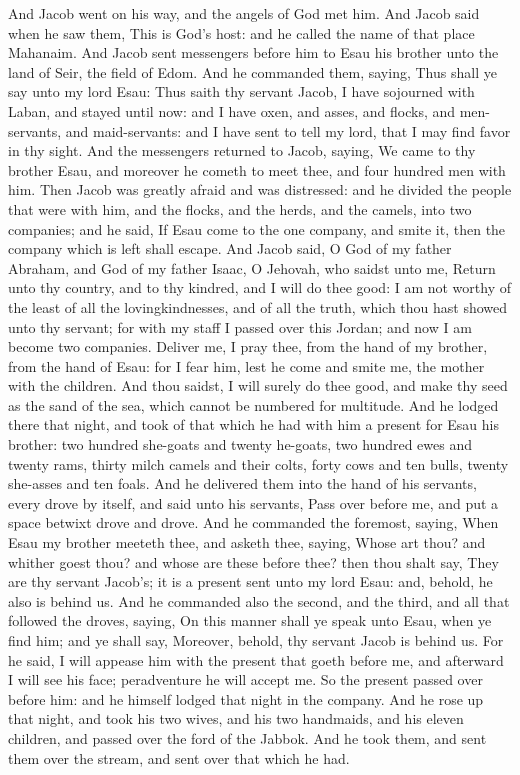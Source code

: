And Jacob went on his way, and the angels of God met him. And Jacob said when he saw them, This is God’s host: and he called the name of that place Mahanaim.  And Jacob sent messengers before him to Esau his brother unto the land of Seir, the field of Edom. And he commanded them, saying, Thus shall ye say unto my lord Esau: Thus saith thy servant Jacob, I have sojourned with Laban, and stayed until now: and I have oxen, and asses, and flocks, and men-servants, and maid-servants: and I have sent to tell my lord, that I may find favor in thy sight. And the messengers returned to Jacob, saying, We came to thy brother Esau, and moreover he cometh to meet thee, and four hundred men with him. Then Jacob was greatly afraid and was distressed: and he divided the people that were with him, and the flocks, and the herds, and the camels, into two companies; and he said, If Esau come to the one company, and smite it, then the company which is left shall escape. And Jacob said, O God of my father Abraham, and God of my father Isaac, O Jehovah, who saidst unto me, Return unto thy country, and to thy kindred, and I will do thee good: I am not worthy of the least of all the lovingkindnesses, and of all the truth, which thou hast showed unto thy servant; for with my staff I passed over this Jordan; and now I am become two companies. Deliver me, I pray thee, from the hand of my brother, from the hand of Esau: for I fear him, lest he come and smite me, the mother with the children. And thou saidst, I will surely do thee good, and make thy seed as the sand of the sea, which cannot be numbered for multitude.  And he lodged there that night, and took of that which he had with him a present for Esau his brother: two hundred she-goats and twenty he-goats, two hundred ewes and twenty rams, thirty milch camels and their colts, forty cows and ten bulls, twenty she-asses and ten foals. And he delivered them into the hand of his servants, every drove by itself, and said unto his servants, Pass over before me, and put a space betwixt drove and drove. And he commanded the foremost, saying, When Esau my brother meeteth thee, and asketh thee, saying, Whose art thou? and whither goest thou? and whose are these before thee? then thou shalt say, They are thy servant Jacob’s; it is a present sent unto my lord Esau: and, behold, he also is behind us. And he commanded also the second, and the third, and all that followed the droves, saying, On this manner shall ye speak unto Esau, when ye find him; and ye shall say, Moreover, behold, thy servant Jacob is behind us. For he said, I will appease him with the present that goeth before me, and afterward I will see his face; peradventure he will accept me. So the present passed over before him: and he himself lodged that night in the company.  And he rose up that night, and took his two wives, and his two handmaids, and his eleven children, and passed over the ford of the Jabbok. And he took them, and sent them over the stream, and sent over that which he had. 